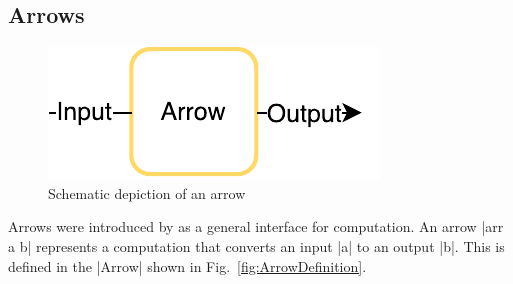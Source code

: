 \subsection{Arrows}
\label{sec:arrows}
\begin{figure}[h]
	\includegraphics{images/arrow}
	\caption{Schematic depiction of an arrow}
\end{figure}
Arrows were introduced by \citet{HughesArrows} as a general interface for computation. An arrow |arr a b| represents  a computation that converts an input |a| to an output |b|. This is defined in the |Arrow| shown in Fig.~\ref{fig:ArrowDefinition}.

